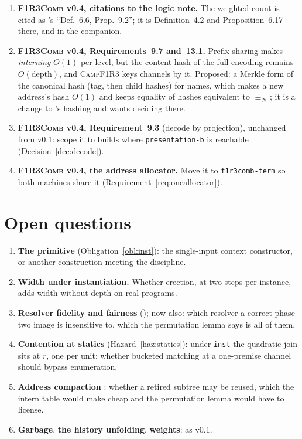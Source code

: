 \documentclass[11pt,a4paper]{article}
\newcommand{\code}[1]{\texttt{#1}}
\newcommand{\Comb}{\textsc{F1R3Comb}}
\newcommand{\Camp}{\textsc{CampF1R3}}
\newcommand{\nequiv}{\equiv_{\mathcal{N}}}
\theoremstyle{definition}
\theoremstyle{plain}
\begin{document}
\begin{enumerate}[leftmargin=1.8em]
\item \textbf{\Comb{} v0.4, citations to the logic note.} The weighted count
is cited as \cite{logic}'s ``Def.~6.6, Prop.~9.2''; it is Definition~4.2 and
Proposition~6.17 there, and \cite[Lem.~9.2]{draft3} in the companion.

\item \textbf{\Comb{} v0.4, Requirements~9.7 and~13.1.} Prefix sharing makes
\emph{interning} $O(1)$ per level, but the content hash of the full encoding
remains $O(\text{depth})$, and \Camp{} keys channels by it. Proposed: a
Merkle form of the canonical hash (tag, then child hashes) for names, which
makes a new address's hash $O(1)$ and keeps equality of hashes equivalent to
$\nequiv$; it is a change to \cite{k1ndl1ng}'s hashing and wants deciding
there.

\item \textbf{\Comb{} v0.4, Requirement~9.3} (decode by projection),
unchanged from v0.1: scope it to builds where \code{presentation-b} is
reachable (Decision~\ref{dec:decode}).

\item \textbf{\Comb{} v0.4, the address allocator.} Move it to
\code{f1r3comb-term} so both machines share it
(Requirement~\ref{req:oneallocator}).

\end{enumerate}

\section{Open questions}

\begin{enumerate}[leftmargin=1.8em]
\item \textbf{The primitive} (Obligation~\ref{obl:inst}): the single-input
context constructor, or another construction meeting the discipline.
\item \textbf{Width under instantiation.} Whether erection, at two steps per
instance, adds width without depth on real programs.
\item \textbf{Resolver fidelity and fairness} (\cite[Obl.~13.1,
Obl.~13.6]{matnote}); now also: which resolver a correct phase-two image is
insensitive to, which the permutation lemma says is all of them.
\item \textbf{Contention at statics} (Hazard~\ref{haz:statics}): under
\code{inst} the quadratic join sits at $r$, one per unit; whether bucketed
matching at a one-premise channel should bypass enumeration.
\item \textbf{Address compaction} \cite[\S15, item~1]{combspec}: whether a
retired subtree may be reused, which the intern table would make cheap and
the permutation lemma would have to license.
\item \textbf{Garbage}, \textbf{the history unfolding}, \textbf{weights}: as
v0.1.
\end{enumerate}
\end{document}
